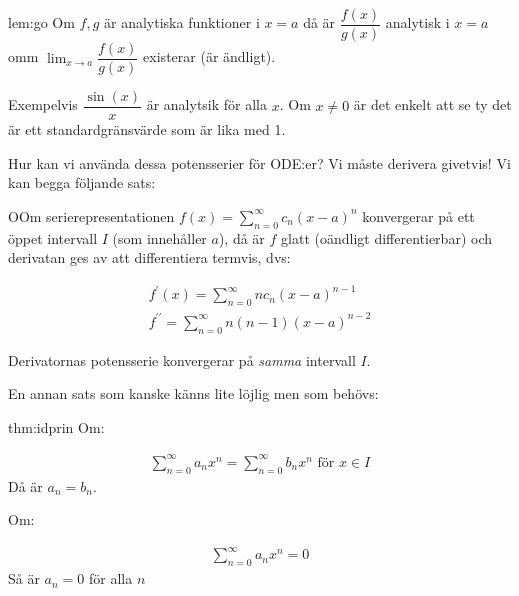 \begin{lem}[När $g=0$ ger analytisk funktion]{lem:go}
  \noindent Om $f, g$ är analytiska funktioner i $x = a$ då är $\dfrac{f(x)}{g(x)}$ analytisk i $x=a$ omm $\lim_{x\to a}\dfrac{f(x)}{g(x)}$ existerar (är ändligt).
\end{lem}
\par\bigskip
\noindent Exempelvis $\dfrac{\sin(x)}{x}$ är analytsik för alla $x$. Om $x\neq  0$ är det enkelt att se ty det är ett standardgränsvärde som är lika med 1.
\par\bigskip
\noindent Hur kan vi använda dessa potensserier för ODE:er? Vi måste derivera givetvis! Vi kan begga följande sats:
\par\bigskip

\begin{theo}
  OOm serierepresentationen $f(x) = \sum_{n=0}^{\infty}c_n(x-a)^n$ konvergerar på ett öppet intervall $I$ (som innehåller $a$), då är $f$ glatt (oändligt differentierbar) och derivatan ges av att differentiera termvis, dvs:


  \begin{equation*}
    \begin{gathered}
      f^{\prime}(x) = \sum_{n=0}^{\infty}nc_n(x-a)^{n-1}\\
      f^{\prime\prime} = \sum_{n=0}^{\infty}n(n-1)(x-a)^{n-2}
    \end{gathered}
  \end{equation*}
  \par\bigskip
  \noindent Derivatornas potensserie konvergerar på \textit{samma} intervall $I$. 
\end{theo}
\par\bigskip
\noindent En annan sats som kanske känns lite löjlig men som behövs:
\par\bigskip

\begin{theo}[Identitetsprincipen]{thm:idprin}
  \noindent Om:

  \begin{equation*}
    \begin{gathered}
      \sum_{n=0}^{\infty}a_nx^n = \sum_{n=0}^{\infty}b_nx^n \text{ för } x\in I
    \end{gathered}
  \end{equation*}
  \noindent Då är $a_n = b_n$.\par
  \noindent Om:

  \begin{equation*}
    \begin{gathered}
      \sum_{n=0}^{\infty}a_nx^n = 0
    \end{gathered}
  \end{equation*}
  \noindent Så är $a_n = 0$ för alla $n$

\end{theo}


